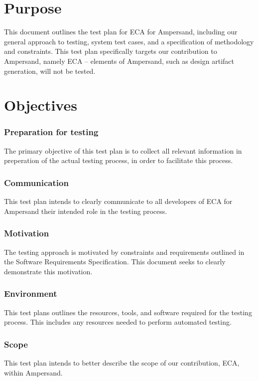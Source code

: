 \documentclass[12pt]{report}
\begin{document}
\section{Purpose} 
This document outlines the test plan for ECA for Ampersand, including our
general approach to testing, system test cases, and a specification of
methodology and constraints. This test plan specifically targets our
contribution to Ampersand, namely ECA -- elements of Ampersand, such as design
artifact generation, will not be tested. 

\section{Objectives}
\subsubsection*{Preparation for testing}
The primary objective of this test plan is to collect all relevant information
in preperation of the actual testing process, in order to facilitate this process.

\subsubsection*{Communication}
This test plan intends to clearly communicate to all developers of ECA for Ampersand 
their intended role in the testing process. 

\subsubsection*{Motivation}
The testing approach is motivated by constraints and requirements outlined in the
Software Requirements Specification. This document seeks to clearly demonstrate
this motivation.

\subsubsection*{Environment}
This test plans outlines the resources, tools, and software required for the
testing process. This includes any resources needed to perform automated testing. 

\subsubsection*{Scope}
This test plan intends to better describe the scope of our contribution, ECA,
within Ampersand. 
\end{document}
